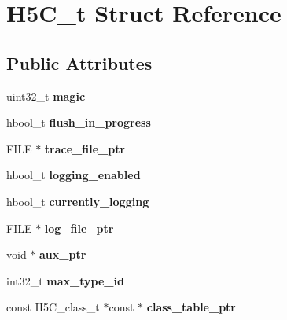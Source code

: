 \hypertarget{struct_h5_c__t}{}\section{H5\+C\+\_\+t Struct Reference}
\label{struct_h5_c__t}
\subsection*{Public Attributes}
\begin{DoxyCompactItemize}
\item 
\mbox{\label{struct_h5_c__t_a66ccadf87266d0a546214f2709754f01}} 
uint32\+\_\+t {\bfseries magic}
\item 
\mbox{\label{struct_h5_c__t_aa3e27bec8a6c21ec086601fcdcb03c05}} 
hbool\+\_\+t {\bfseries flush\+\_\+in\+\_\+progress}
\item 
\mbox{\label{struct_h5_c__t_ab0597c0f7e93255a372049b6e27ab631}} 
F\+I\+LE $\ast$ {\bfseries trace\+\_\+file\+\_\+ptr}
\item 
\mbox{\label{struct_h5_c__t_a688b343e6a04402241cb88e31d385ab6}} 
hbool\+\_\+t {\bfseries logging\+\_\+enabled}
\item 
\mbox{\label{struct_h5_c__t_a036929c11d4588874da1f79482969812}} 
hbool\+\_\+t {\bfseries currently\+\_\+logging}
\item 
\mbox{\label{struct_h5_c__t_ab0a6a6e6cba877ade866ab9e9f808718}} 
F\+I\+LE $\ast$ {\bfseries log\+\_\+file\+\_\+ptr}
\item 
\mbox{\label{struct_h5_c__t_a0653f7c89a15a3e8e7da3c9702418bb2}} 
void $\ast$ {\bfseries aux\+\_\+ptr}
\item 
\mbox{\label{struct_h5_c__t_a2a24b501c7827c810586116570a19781}} 
int32\+\_\+t {\bfseries max\+\_\+type\+\_\+id}
\item 
\mbox{\label{struct_h5_c__t_a77e2ccdd8d8818234b64ee12ea95591b}} 
const H5\+C\+\_\+class\+\_\+t $\ast$const  $\ast$ {\bfseries class\+\_\+table\+\_\+ptr}
\item 

\end{DoxyCompactItemize}

